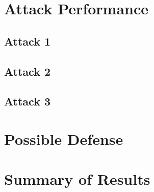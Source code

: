     \section{Attack Performance}

        \subsection*{Attack 1}

        \subsection*{Attack 2}

        \subsection*{Attack 3}
    
    \section{Possible Defense}

    \section{Summary of Results}
